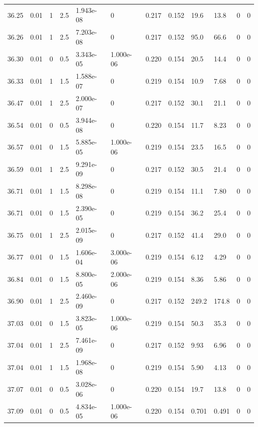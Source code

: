 \documentclass[preview]{standalone}
\begin{document}
{{{{{{{{{{{{{{{{{\begin{tabular}{L{1.2cm}C{1.2cm} C{0.3cm}C{0.5cm} C{1.4cm}C{1.4cm} C{1.4cm}C{1.4cm} C{1.6cm}C{1.6cm} C{1.6cm}C{1.6cm}}
  36.25  &  0.01  & 1     & 2.5 &  1.943e-08  & 0  &  0.217&   0.152& 19.6 & 13.8   &  0 & 0  \\ 
  36.26  &  0.01  & 1     & 2.5 &  7.203e-08  & 0  &  0.217&   0.152& 95.0 & 66.6   &  0 & 0  \\ 
  36.30  &  0.01  & 0     & 0.5 &  3.343e-05  & 1.000e-06  &  0.220&   0.154& 20.5 & 14.4   &  0 & 0  \\ 
  36.33  &  0.01  & 1     & 1.5 &  1.588e-07  & 0  &  0.219&   0.154& 10.9 & 7.68   &  0 & 0  \\ 
  36.47  &  0.01  & 1     & 2.5 &  2.000e-07  & 0  &  0.217&   0.152& 30.1 & 21.1   &  0 & 0  \\ 
  36.54  &  0.01  & 0     & 0.5 &  3.944e-08  & 0  &  0.220&   0.154& 11.7 & 8.23   &  0 & 0  \\ 
  36.57  &  0.01  & 0     & 1.5 &  5.885e-05  & 1.000e-06  &  0.219&   0.154& 23.5 & 16.5   &  0 & 0  \\ 
  36.59  &  0.01  & 1     & 2.5 &  9.291e-09  & 0  &  0.217&   0.152& 30.5 & 21.4   &  0 & 0  \\ 
  36.71  &  0.01  & 1     & 1.5 &  8.298e-08  & 0  &  0.219&   0.154& 11.1 & 7.80   &  0 & 0  \\ 
  36.71  &  0.01  & 0     & 1.5 &  2.390e-05  & 0  &  0.219&   0.154& 36.2 & 25.4   &  0 & 0  \\ 
  36.75  &  0.01  & 1     & 2.5 &  2.015e-09  & 0  &  0.217&   0.152& 41.4 & 29.0   &  0 & 0  \\ 
  36.77  &  0.01  & 0     & 1.5 &  1.606e-04  & 3.000e-06  &  0.219&   0.154& 6.12 & 4.29   &  0 & 0  \\ 
  36.84  &  0.01  & 0     & 1.5 &  8.800e-05  & 2.000e-06  &  0.219&   0.154& 8.36 & 5.86   &  0 & 0  \\ 
  36.90  &  0.01  & 1     & 2.5 &  2.460e-09  & 0  &  0.217&   0.152& 249.2 & 174.8   &  0 & 0  \\ 
  37.03  &  0.01  & 0     & 1.5 &  3.823e-05  & 1.000e-06  &  0.219&   0.154& 50.3 & 35.3   &  0 & 0  \\ 
  37.04  &  0.01  & 1     & 2.5 &  7.461e-09  & 0  &  0.217&   0.152& 9.93 & 6.96   &  0 & 0  \\ 
  37.04  &  0.01  & 1     & 1.5 &  1.968e-08  & 0  &  0.219&   0.154& 5.90 & 4.13   &  0 & 0  \\ 
  37.07  &  0.01  & 0     & 0.5 &  3.028e-06  & 0  &  0.220&   0.154& 19.7 & 13.8   &  0 & 0  \\ 
  37.09  &  0.01  & 0     & 0.5 &  4.834e-05  & 1.000e-06  &  0.220&   0.154& 0.701 & 0.491   &  0 & 0  \\ 

\end{tabular}}}}}}}}}}}}}}}}}}
\end{document}

